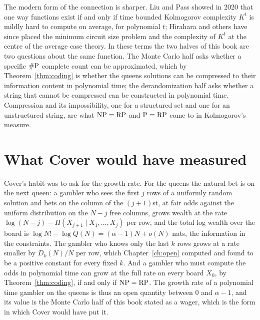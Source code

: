 The modern form of the connection is sharper. Liu and Pass \cite{LiuPass} showed in 2020 that one way functions exist if and only if time bounded Kolmogorov complexity $K^t$ is mildly hard to compute on average, for polynomial $t$; Hirahara and others have since placed the minimum circuit size problem and the complexity of $K^t$ at the centre of the average case theory. In these terms the two halves of this book are two questions about the same function. The Monte Carlo half asks whether a specific $\#\mathrm{P}$ complete count can be approximated, which by Theorem~\ref{thm:coding} is whether the queens solutions can be compressed to their information content in polynomial time; the derandomization half asks whether a string that cannot be compressed can be constructed in polynomial time. Compression and its impossibility, one for a structured set and one for an unstructured string, are what $\mathrm{NP} = \mathrm{RP}$ and $\mathrm{P} = \mathrm{RP}$ come to in Kolmogorov's measure.

\section{What Cover would have measured}

Cover's habit was to ask for the growth rate. For the queens the natural bet is on the next queen: a gambler who sees the first $j$ rows of a uniformly random solution and bets on the column of the $(j+1)$st, at fair odds against the uniform distribution on the $N - j$ free columns, grows wealth at the rate $\log(N - j) - H(X_{j+1} \mid X_1, \dots, X_j)$ per row, and the total log wealth over the board is $\log N! - \log Q(N) = (\alpha - 1) N + o(N)$ nats, the information in the constraints. The gambler who knows only the last $k$ rows grows at a rate smaller by $D_k(N) / N$ per row, which Chapter~\ref{ch:open} computed and found to be a positive constant for every fixed $k$. And a gambler who must compute the odds in polynomial time can grow at the full rate on every board $X_0$, by Theorem~\ref{thm:coding}, if and only if $\mathrm{NP} = \mathrm{RP}$. The growth rate of a polynomial time gambler on the queens is thus an open quantity between $0$ and $\alpha - 1$, and its value is the Monte Carlo half of this book stated as a wager, which is the form in which Cover would have put it.
